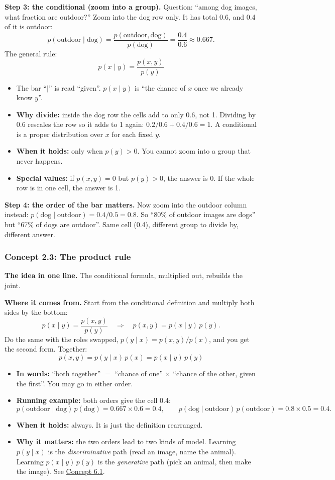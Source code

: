 \documentclass[12pt,a4paper]{article}
\begin{document}
\textbf{Step 3: the conditional (zoom into a group).} Question: ``among dog images, what fraction are outdoor?'' Zoom into the dog row only. It has total 0.6, and 0.4 of it is outdoor:
\[
p(\text{outdoor}\mid\text{dog})=\frac{p(\text{outdoor},\text{dog})}{p(\text{dog})}=\frac{0.4}{0.6}\approx0.667 .
\]
The general rule:
\[
p(x\mid y)=\frac{p(x,y)}{p(y)}
\]
\begin{itemize}[nosep]
  \item The bar ``$\mid$'' is read ``given''. $p(x\mid y)$ is ``the chance of $x$ once we already know $y$''.
  \item \textbf{Why divide:} inside the dog row the cells add to only 0.6, not 1. Dividing by 0.6 rescales the row so it adds to 1 again: $0.2/0.6+0.4/0.6=1$. A conditional is a proper distribution over $x$ for each fixed $y$.
  \item \textbf{When it holds:} only when $p(y)>0$. You cannot zoom into a group that never happens.
  \item \textbf{Special values:} if $p(x,y)=0$ but $p(y)>0$, the answer is 0. If the whole row is in one cell, the answer is 1.
\end{itemize}

\textbf{Step 4: the order of the bar matters.} Now zoom into the outdoor column instead: $p(\text{dog}\mid\text{outdoor})=0.4/0.5=0.8$. So ``80\% of outdoor images are dogs'' but ``67\% of dogs are outdoor''. Same cell (0.4), different group to divide by, different answer.

\subsubsection{Concept 2.3: The product rule}\label{c2-3}

\textbf{The idea in one line.} The conditional formula, multiplied out, rebuilds the joint.

\textbf{Where it comes from.} Start from the conditional definition and multiply both sides by the bottom:
\[
p(x\mid y)=\frac{p(x,y)}{p(y)}\quad\Longrightarrow\quad p(x,y)=p(x\mid y)\,p(y).
\]
Do the same with the roles swapped, $p(y\mid x)=p(x,y)/p(x)$, and you get the second form. Together:
\[
p(x,y)=p(y\mid x)\,p(x)=p(x\mid y)\,p(y)
\]
\begin{itemize}[nosep]
  \item \textbf{In words:} ``both together'' $=$ ``chance of one'' $\times$ ``chance of the other, given the first''. You may go in either order.
  \item \textbf{Running example:} both orders give the cell 0.4:
  \[
  p(\text{outdoor}\mid\text{dog})\,p(\text{dog})=0.667\times0.6=0.4,\qquad p(\text{dog}\mid\text{outdoor})\,p(\text{outdoor})=0.8\times0.5=0.4 .
  \]
  \item \textbf{When it holds:} always. It is just the definition rearranged.
  \item \textbf{Why it matters:} the two orders lead to two kinds of model. Learning $p(y\mid x)$ is the \emph{discriminative} path (read an image, name the animal). Learning $p(x\mid y)\,p(y)$ is the \emph{generative} path (pick an animal, then make the image). See \hyperref[c6-1]{Concept 6.1}.
\end{itemize}
\end{document}
